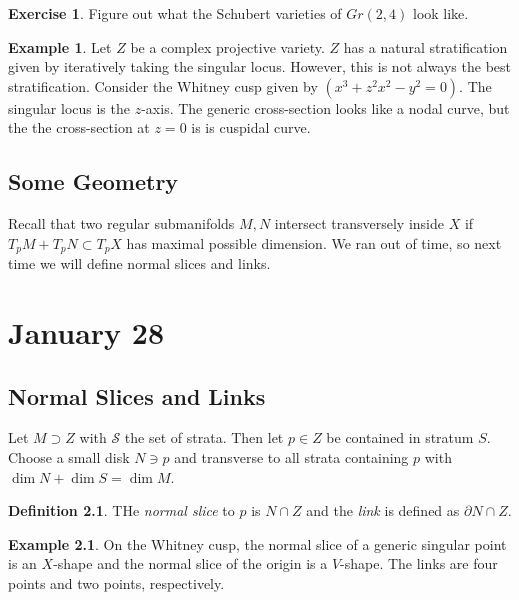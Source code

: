 \documentclass[leqno, openany]{memoir}
\theoremstyle{definition}
\newtheorem{defn}[thm]{Definition}
\newtheorem{exm}[thm]{Example}
\newtheorem{exer}[thm]{Exercise}
\theoremstyle{remark}
\theoremstyle{plain}
\theoremstyle{definition}
\theoremstyle{remark}
\newcommand{\mc}[1]{\mathcal{#1}}
\begin{document}
\begin{exer} Figure out what the Schubert varieties of $Gr(2,4)$ look like.
\end{exer}

\begin{exm} Let $Z$ be a complex projective variety. $Z$ has a natural
    stratification given by iteratively taking the singular locus. However,
    this is not always the best stratification. Consider the Whitney cusp given
    by $(x^3+z^2x^2-y^2 = 0)$. The singular locus is the $z$-axis. The generic
    cross-section looks like a nodal curve, but the the cross-section at $z=0$
    is is cuspidal curve.  \end{exm}

\section{Some Geometry}%

Recall that two regular submanifolds $M,N$ intersect transversely inside $X$ if
$T_p M + T_p N \subset T_p X$ has maximal possible dimension. We ran out of
time, so next time we will define normal slices and links.

\chapter{January 28}%

\section{Normal Slices and Links}%

Let $M \supset Z$ with $\mc{S}$ the set of strata. Then let $p \in Z$ be
contained in stratum $S$. Choose a small disk $N \ni p$ and transverse to all
strata containing $p$ with $\dim N + \dim S = \dim M$.

\begin{defn} THe \textit{normal slice} to $p$ is $N \cap Z$ and the
\textit{link} is defined as $\partial N \cap Z$.  \end{defn}

\begin{exm} On the Whitney cusp, the normal slice of a generic singular point
is an $X$-shape and the normal slice of the origin is a $V$-shape. The links
are four points and two points, respectively.  \end{exm}
\end{document}
